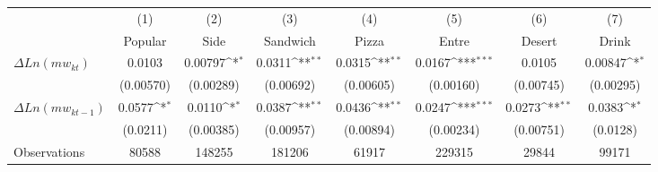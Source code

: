 {
\def\sym#1{\ifmmode^{#1}\else\(^{#1}\)\fi}
\begin{tabular}{l*{7}{c}}
\hline\hline
                    &\multicolumn{1}{c}{(1)}&\multicolumn{1}{c}{(2)}&\multicolumn{1}{c}{(3)}&\multicolumn{1}{c}{(4)}&\multicolumn{1}{c}{(5)}&\multicolumn{1}{c}{(6)}&\multicolumn{1}{c}{(7)}\\
                    &\multicolumn{1}{c}{Popular}&\multicolumn{1}{c}{Side}&\multicolumn{1}{c}{Sandwich}&\multicolumn{1}{c}{Pizza}&\multicolumn{1}{c}{Entre}&\multicolumn{1}{c}{Desert}&\multicolumn{1}{c}{Drink}\\
\hline
$\Delta Ln(mw_{kt})$  &      0.0103         &     0.00797\sym{*}  &      0.0311\sym{**} &      0.0315\sym{**} &      0.0167\sym{***}&      0.0105         &     0.00847\sym{*}  \\
                    &   (0.00570)         &   (0.00289)         &   (0.00692)         &   (0.00605)         &   (0.00160)         &   (0.00745)         &   (0.00295)         \\
[1em]
$\Delta Ln(mw_{kt-1})$&      0.0577\sym{*}  &      0.0110\sym{*}  &      0.0387\sym{**} &      0.0436\sym{**} &      0.0247\sym{***}&      0.0273\sym{**} &      0.0383\sym{*}  \\
                    &    (0.0211)         &   (0.00385)         &   (0.00957)         &   (0.00894)         &   (0.00234)         &   (0.00751)         &    (0.0128)         \\
\hline
Observations        &       80588         &      148255         &      181206         &       61917         &      229315         &       29844         &       99171         \\
\hline\hline
\end{tabular}
}
